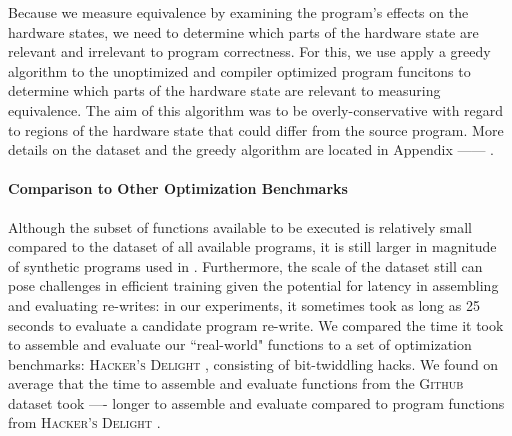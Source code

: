 \documentclass{article}
\newcommand{\GH}{\textsc{Github}}
\begin{document}

Because we measure equivalence by examining the program's effects on the hardware states, we need to determine which parts of the hardware state are relevant and irrelevant to program correctness.   For this, we use apply a greedy algorithm to the unoptimized and compiler optimized program funcitons to determine which parts of the hardware state are relevant to measuring equivalence. The aim of this algorithm was to be overly-conservative with regard to regions of the hardware state that could differ from the source program. More details on the dataset and the greedy algorithm are located in Appendix ------  .


\paragraph{Comparison to Other Optimization Benchmarks}
Although the subset of functions available to be executed is relatively small compared to the dataset of all available programs, it is still larger in magnitude of synthetic programs used in \cite{shi2020} . Furthermore, the scale of the dataset still can pose challenges in efficient training given the potential for latency in assembling and evaluating re-writes: in our experiments, it sometimes took as long as 25 seconds to evaluate a candidate program re-write. We compared the time it took to assemble and evaluate our ``real-world" functions to a set of optimization benchmarks: \textsc{Hacker's Delight} \cite{warren2013hacker}, consisting of bit-twiddling hacks. We found on average that the time to assemble and evaluate functions from the \GH{} dataset took ---- longer to assemble and evaluate compared to program functions from \textsc{Hacker's Delight} . 
\end{document}
